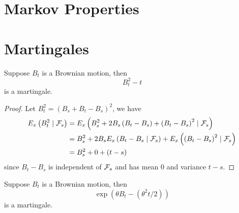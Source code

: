 \section{Markov Properties}

\section{Martingales}

\begin{example}
	Suppose $B_{t}$ is a Brownian motion, then $$B_{t}^{2}-t$$ is a martingale.
\end{example}

\begin{proof}
	Let $B_{t}^{2}=\left(B_{s}+B_{t}-B_{s}\right)^{2}$, we have
	\begin{equation*}
		\begin{aligned}
			E_{x}\left(B_{t}^{2}\mid{\mathcal F}_{s}\right) & =E_{x}\left(B_{s}^{2}+2 B_{s}\left(B_{t}-B_{s}\right)+\left(B_{t}-B_{s}\right)^{2} \mid {\mathcal F}_{s}\right)                     \\
			                                        & =B_{s}^{2}+2 B_{s} E_{x}\left(B_{t}-B_{s} \mid {\mathcal F}_{s}\right)+E_{x}\left(\left(B_{t}-B_{s}\right)^{2} \mid {\mathcal F}_{s}\right) \\
			                                        & =B_{s}^{2}+0+(t-s)
		\end{aligned}
	\end{equation*}
	since $B_{t}-B_{s}$ is independent of ${\mathcal F}_{s}$ and has mean 0 and variance $t-s$.
\end{proof}

\begin{example}
	Suppose $B_{t}$ is a Brownian motion, then $$\exp\left(\theta B_{t}-\left(\theta^{2}t/2\right)\right)$$ is a martingale.
\end{example}

